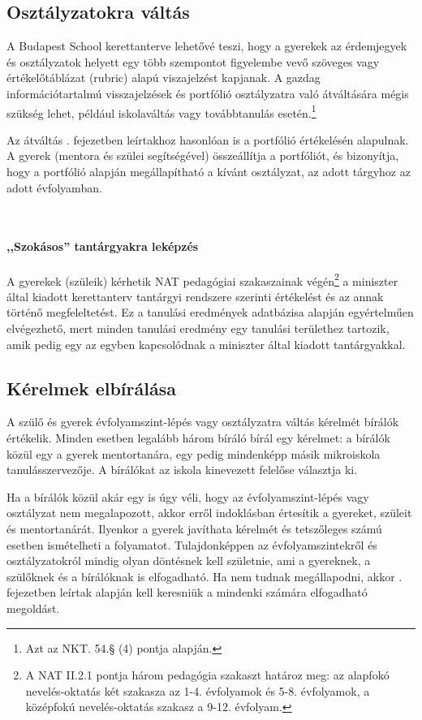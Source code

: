 \subsection{Osztályzatokra váltás}
\label{sec:osztalyzatok}
A Budapest School kerettanterve lehetővé teszi, hogy a gyerekek az érdemjegyek
és osztályzatok
helyett egy több szempontot figyelembe vevő szöveges vagy értékelőtáblázat
(rubric) alapú viszajelzést kapjanak.
A gazdag információtartalmú visszajelzések és portfólió osztályzatra való
átváltására mégis szükség lehet, például iskolaváltás vagy továbbtanulás
esetén.\footnote{Azt az NKT. 54.§ (4) pontja alapján.}

Az átváltás .
fejezetben leírtakhoz
hasonlóan is a portfólió értékelésén alapulnak.
A gyerek (mentora és szülei segítségével) összeállítja a portfóliót, és
bizonyítja, hogy a portfólió alapján megállapítható a kívánt osztályzat, az
adott tárgyhoz az adott évfolyamban.

 \paragraph{,,Szokásos'' tantárgyakra leképzés}
A gyerekek (szüleik) kérhetik NAT pedagógiai szakaszainak
végén\footnote{A NAT II.2.1 pontja három pedagógia szakaszt határoz meg: az
    alapfokó nevelés-oktatás két szakasza az 1-4. évfolyamok és 5-8.
    évfolyamok,
    a középfokú nevelés-oktatás szakasz a 9-12. évfolyam.}
a miniszter
által kiadott kerettanterv tantárgyi rendszere szerinti értékelést és az annak
történő megfeleltetést. Ez a tanulási eredmények adatbázisa alapján
egyértelműen elvégezhető, mert minden tanulási eredmény egy tanulási területhez
tartozik, amik pedig egy az egyben kapcsolódnak a miniszter által kiadott
tantárgyakkal.

\subsection{Kérelmek elbírálása}

A szülő és gyerek évfolyamszint-lépés vagy osztályzatra váltás kérelmét bírálók
értékelik. Minden esetben legalább három bíráló bírál egy kérelmet: a
bírálók közül egy a gyerek mentortanára, egy pedig mindenképp másik mikroiskola
tanulásszervezője. A bírálókat az iskola kinevezett felelőse választja ki.

Ha a bírálók közül akár egy is úgy véli, hogy az évfolyamszint-lépés vagy
osztályzat nem megalapozott, akkor
erről indoklásban értesítik a gyereket, szüleit és mentortanárát. Ilyenkor a
gyerek javíthata kérelmét és tetszőleges számú esetben ismételheti a
folyamatot. Tulajdonképpen az évfolyamszintekről és osztályzatokról mindig
olyan döntésnek kell születnie, ami a gyereknek, a szülőknek és a bírálóknak is
elfogadható. Ha nem tudnak megállapodni, akkor
. fejezetben leírtak alapján kell keresniük a
mindenki számára elfogadható megoldást.

